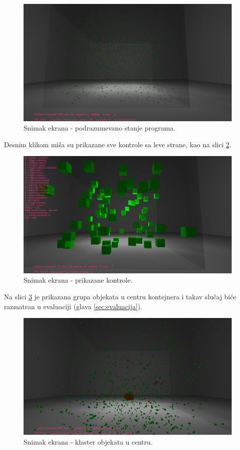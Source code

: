 \documentclass[12pt,oneside]{memoir}
\begin{document}
\begin{figure}[h!]
	\centerfloat
	\includegraphics[scale=0.3]{ssdefault.png}
	\caption{Snimak ekrana - podrazumevano stanje programa.}
	\label{fig:ssdefault}
\end{figure}

\noindent Desnim klikom miša su prikazane sve kontrole sa leve strane, kao na slici \ref{fig:ssinfo}.

\begin{figure}[h!]
	\centerfloat
	\includegraphics[scale=0.3]{ssinfo.png}
	\caption{Snimak ekrana - prikazane kontrole.}
	\label{fig:ssinfo}
\end{figure}

\noindent Na slici \ref{fig:ssyank} je prikazana grupa objekata u centru kontejnera i takav slučaj biće 
razmatran u evaluaciji (glava \ref{sec:evaluacija}).

\begin{figure}[h!]
	\centerfloat
	\includegraphics[scale=0.3]{ssyank.jpg}
	\caption{Snimak ekrana - klaster objekata u centru.}
	\label{fig:ssyank}
\end{figure}
\end{document}
